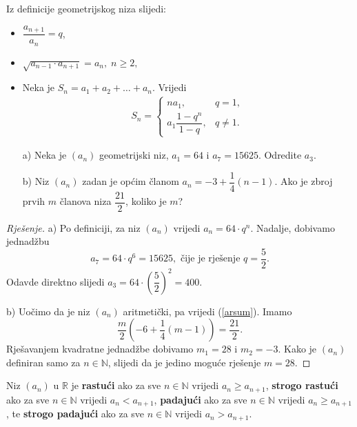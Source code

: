 \noindent Iz definicije geometrijskog niza slijedi:
\begin{itemize}
\item $\dfrac{a_{n+1}}{a_n}=q$,
\item $\sqrt{a_{n-1}\cdot a_{n+1}}=a_n, \; n\geq 2,$
\item Neka je $S_n=a_1+a_2+\dots+a_n$. Vrijedi
\begin{gather}
\label{geosum}
S_n=\begin{cases}
na_1, & q=1, \\
a_1\dfrac{1-q^n}{1-q}, & q\neq 1.
   \end{cases}
\end{gather}
\end{itemize}
\begin{exercise}\textbf{}
\begin{itemize}
\item[a)] Neka je $(a_n)$ geometrijski niz, $a_1=64$ i $a_7=15625$. Odredite $a_3$.
\item[b)] Niz $(a_n)$ zadan je općim članom $a_n=-3+\dfrac{1}{4}(n-1)$. Ako je zbroj prvih $m$ članova niza $\dfrac{21}{2}$, koliko je $m$?
\end{itemize}
\end{exercise}
\begin{proof}[Rješenje]
a) Po definiciji, za niz $(a_n)$ vrijedi $a_n=64\cdot q^n$. Nadalje, dobivamo jednadžbu
$$a_7=64\cdot q^6=15625,\text{ čije je rješenje } q=\dfrac{5}{2}.$$
Odavde direktno slijedi $a_3=64\cdot \left(\dfrac{5}{2}\right)^2=400.$

b) Uočimo da je niz $(a_n)$ aritmetički, pa vrijedi (\ref{arsum}). Imamo
$$\dfrac{m}{2}\left(-6+\dfrac{1}{4}(m-1)\right)=\dfrac{21}{2}.$$
Rješavanjem kvadratne jednadžbe dobivamo $m_1=28$ i $m_2=-3$. Kako je $(a_n)$ definiran samo za $n\in \mathbb{N}$, slijedi da je jedino moguće rješenje $m=28$.
\end{proof}
\begin{definition}
Niz $(a_n)$ u $\mathbb{R}$ je \textbf{rastući} ako za sve $n\in \mathbb{N}$ vrijedi $a_n\geq a_{n+1}$, \textbf{strogo rastući} ako za sve $n\in \mathbb{N}$ vrijedi $a_n<a_{n+1}$, \textbf{padajući} ako za sve $n\in \mathbb{N}$ vrijedi $a_n\geq a_{n+1}$, te \textbf{strogo padajući} ako za sve $n\in \mathbb{N}$ vrijedi $a_n>a_{n+1}$.
\end{definition}

